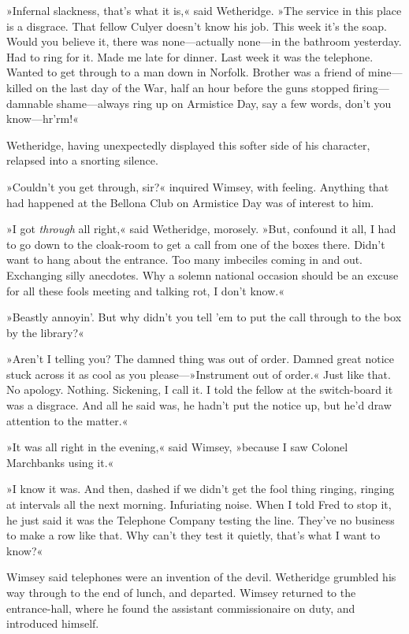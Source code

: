 »Infernal slackness, that's what it is,« said Wetheridge. »The service in this place is a disgrace. That fellow Culyer doesn't know his job. This week it's the soap. Would you believe it, there was none—actually none—in the bathroom yesterday. Had to ring for it. Made me late for dinner. Last week it was the telephone. Wanted to get through to a man down in Norfolk. Brother was a friend of mine—killed on the last day of the War, half an hour before the guns stopped firing—damnable shame—always ring up on Armistice Day, say a few words, don't you know—hr'rm!«

Wetheridge, having unexpectedly displayed this softer side of his character, relapsed into a snorting silence.

»Couldn't you get through, sir?« inquired Wimsey, with feeling. Anything that had happened at the Bellona Club on Armistice Day was of interest to him.

»I got \textit{through} all right,« said Wetheridge, morosely. »But, confound it all, I had to go down to the cloak-room to get a call from one of the boxes there. Didn't want to hang about the entrance. Too many imbeciles coming in and out. Exchanging silly anecdotes. Why a solemn national occasion should be an excuse for all these fools meeting and talking rot, I don't know.«

»Beastly annoyin'. But why didn't you tell 'em to put the call through to the box by the library?«

»Aren't I telling you? The damned thing was out of order. Damned great notice stuck across it as cool as you please—»Instrument out of order.« Just like that. No apology. Nothing. Sickening, I call it. I told the fellow at the switch-board it was a disgrace. And all he said was, he hadn't put the notice up, but he'd draw attention to the matter.«

»It was all right in the evening,« said Wimsey, »because I saw Colonel Marchbanks using it.«

»I know it was. And then, dashed if we didn't get the fool thing ringing, ringing at intervals all the next morning. Infuriating noise. When I told Fred to stop it, he just said it was the Telephone Company testing the line. They've no business to make a row like that. Why can't they test it quietly, that's what I want to know?«

Wimsey said telephones were an invention of the devil. Wetheridge grumbled his way through to the end of lunch, and departed. Wimsey returned to the entrance-hall, where he found the assistant commissionaire on duty, and introduced himself.

